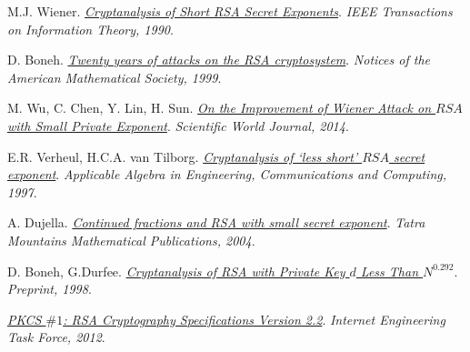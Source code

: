 \documentclass[twoside,symmetric,justified,openany,nobib]{tufte-book}
\begin{document}
\begin{thebibliography}{99}
\begin{tcolorbox}[enhanced, breakable, colback=white, colframe=white, check odd page, toggle left and right, grow to left by=0.5cm, grow to right by=\marginparwidth+\marginparsep, toggle enlargement=evenpage]
    M.J. Wiener.
    \href{https://sites.google.com/site/michaeljameswiener/}{\textit{Cryptanalysis of Short RSA Secret Exponents}}.
    \textit{IEEE Transactions on Information Theory, 1990}.
  

    D. Boneh.
    \href{https://crypto.stanford.edu/~dabo/papers/RSA-survey.pdf}{\textit{Twenty years of attacks on the RSA cryptosystem}}.
    \textit{Notices of the American Mathematical Society, 1999}.
  

    M. Wu, C. Chen, Y. Lin, H. Sun.
    \href{https://www.researchgate.net/publication/263585403_On_the_Improvement_of_Wiener_Attack_on_RSA_with_Small_Private_Exponent}{\textit{On the Improvement of Wiener Attack on $RSA$ with Small Private Exponent}}.
    \textit{Scientific World Journal, 2014}.
  

    E.R. Verheul, H.C.A. van Tilborg.
    \href{http://www.cs.ru.nl/~E.Verheul/papers/AiE1997/AiE1997.pdf}{\textit{Cryptanalysis of `less short' $RSA$ secret exponent}}.
    \textit{Applicable Algebra in Engineering, Communications and Computing, 1997}.
  

    A. Dujella.
    \href{https://arxiv.org/pdf/cs/0402052.pdf}{\textit{Continued fractions and RSA with small secret exponent}}.
    \textit{Tatra Mountains Mathematical Publications, 2004}.
  

    D. Boneh, G.Durfee.
    \href{http://citeseerx.ist.psu.edu/viewdoc/summary?doi=10.1.1.40.2636}{\textit{Cryptanalysis of RSA with Private Key $d$ Less Than $N^{0.292}$}}.
    \textit{Preprint, 1998}.
  

    \href{https://tools.ietf.org/html/rfc8017}{\textit{PKCS $\#1$: RSA Cryptography Specifications Version 2.2}}.
    \textit{Internet Engineering Task Force, 2012}.
  

\end{tcolorbox}
\end{thebibliography}
\end{document}
